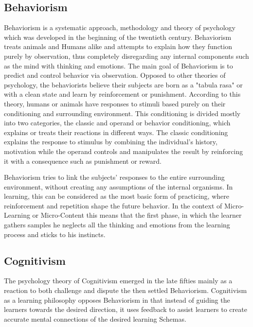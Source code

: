 \subsection{Behaviorism}

Behaviorism is a systematic approach, methodology and theory of psychology which
was developed in the beginning of the twentieth century. Behaviorism treats 
animals and Humans alike and attempts to explain how they function 
purely by observation, thus completely disregarding any internal components such 
as the mind with thinking and emotions. The main goal of Behaviorism is to predict
and control behavior via observation. Opposed to other theories of psychology, the
behaviorists believe their subjects are born as a "tabula rasa" or with a 
clean state and learn by reinforcement or punishment. According to this theory,
humans or animals have responses to stimuli based purely on their conditioning
and surrounding environment. This conditioning is divided mostly into two 
categories, the classic and operand or behavior conditioning, which explains or 
treats their reactions in different ways. The classic conditioning explains the 
response to stimulus by combining the individual's history, motivation while 
the operand controls and manipulates the result by reinforcing it with a 
consequence such as punishment or reward.

Behaviorism tries to link the subjects' responses to the entire surrounding 
environment, without creating any assumptions of the internal organisms. In 
learning, this can be considered as the most basic form of practicing, where 
reinforcement and repetition shape the future behavior. In the context of 
Micro-Learning or Micro-Content this means that the first phase, in which the 
learner gathers samples he neglects all the thinking and emotions from the learning
process and sticks to his instincts.



\subsection{Cognitivism}

The psychology theory of Cognitivism emerged in the late fifties mainly as a 
reaction to both challenge and dispute the then settled Behaviorism.
Cognitivism as a learning philosophy opposes Behaviorism in that instead of 
guiding the learners towards the desired direction, it uses feedback to assist 
learners to create accurate mental connections of the desired learning Schemas.

